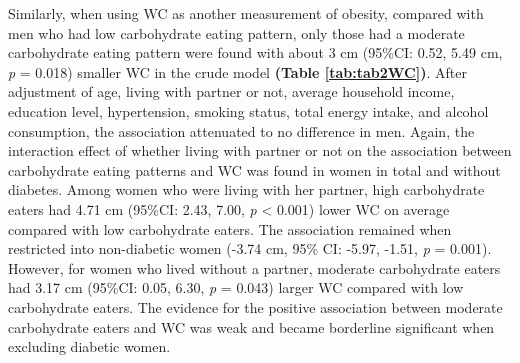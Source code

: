 Similarly, when using WC as another measurement of obesity, compared with men who had low carbohydrate eating pattern, only those had a moderate carbohydrate eating pattern were found with about 3 cm (95\%CI: 0.52, 5.49 cm, \textit{p} = 0.018) smaller WC in the crude model \textbf{(Table \ref{tab:tab2WC})}. After adjustment of age, living with partner or not, average household income, education level, hypertension, smoking status, total energy intake, and alcohol consumption, the association attenuated to no difference in men. Again, the interaction effect of whether living with partner or not on the association between carbohydrate eating patterns and WC was found in women in total and without diabetes. Among women who were living with her partner, high carbohydrate eaters had 4.71 cm (95\%CI: 2.43, 7.00, \textit{p} < 0.001) lower WC on average compared with low carbohydrate eaters. The association remained when restricted into non-diabetic women (-3.74 cm, 95\% CI: -5.97, -1.51,  \textit{p} = 0.001). However, for women who lived without a partner, moderate carbohydrate eaters had 3.17 cm (95\%CI: 0.05, 6.30, \textit{p} = 0.043) larger WC compared with low carbohydrate eaters. The evidence for the positive association between moderate carbohydrate eaters and WC was weak and became borderline significant when excluding diabetic women.

